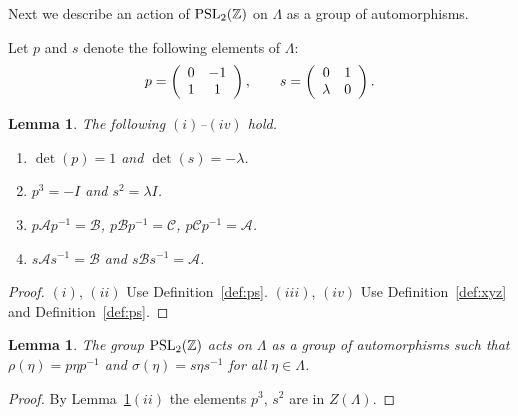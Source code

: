 \documentclass[pdftex]{sigma}
\numberwithin{equation}{section}
\newtheorem{Lemma}[Theorem]{Lemma}
\begin{document}
  Next we describe an
action of ${\rm  {PSL}}_2(\mathbb Z)$ on $\Lambda $ as
a group of automorphisms.

\begin{Definition}
\label{def:ps}
Let $p$ and $s$ denote the following elements
of $\Lambda $:
\begin{gather*}
p =
\left(
\begin{array}{  c c}
0 & -1   \\
1 & 1
\end{array}
\right),
\qquad
s =
\left(
\begin{array}{  c c}
0 &  1 \\
\lambda  & 0
\end{array}
\right).
\end{gather*}
\end{Definition}

\begin{Lemma}
\label{lem:4}
The following $(i)$--$(iv)$ hold.
\begin{enumerate}\itemsep=0pt
\item[$(i)$] $\det (p)=1$ and  $\det (s)=-\lambda$.
\item[$(ii)$]
 $p^3=-I$ and $s^2=\lambda I $.
\item[$(iii)$]
$p \mathcal A p^{-1} = \mathcal B$,
$p  \mathcal B p^{-1} = \mathcal C$,
$p \mathcal C p^{-1} = \mathcal A$.
\item[$(iv)$]
$s \mathcal A s^{-1} = \mathcal B$ and
$s \mathcal B s^{-1} = \mathcal A$.
\end{enumerate}
\end{Lemma}

\begin{proof}
$(i)$, $(ii)$
Use Def\/inition~\ref{def:ps}.
$(iii)$, $(iv)$ Use
Def\/inition~\ref{def:xyz}
and
Def\/inition~\ref{def:ps}.
\end{proof}





\begin{Lemma}
\label{lem:conj}
The group
${\rm  {PSL}}_2(\mathbb Z)$ acts on $\Lambda $ as a group of
automorphisms such
that
$\rho(\eta )= p \eta p^{-1}$
and
$\sigma (\eta ) = s \eta s^{-1}$ for all
$\eta  \in \Lambda $.
\end{Lemma}

\begin{proof}
By Lemma~\ref{lem:4}$(ii)$ the elements  $p^3$, $s^2$ are in $Z(\Lambda)$.
\end{proof}
\end{document}
